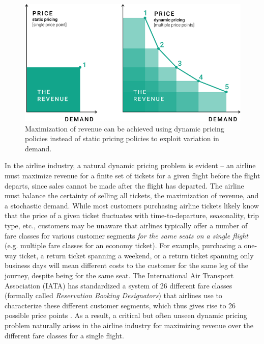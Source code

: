 \documentclass[letterpaper]{article}%
\begin{document}
\begin{figure}[t]
    \centering
    \includegraphics[width=0.99\linewidth]{final-paper/plots/static-dynamic-pricing.png}
    \caption{Maximization of revenue can be achieved using dynamic pricing policies instead of static pricing policies to exploit variation in demand. \cite{Competitoor2016Dynamic2016}}
    \label{fig:static-dynamic-pricing}
\end{figure}

In the airline industry, a natural dynamic pricing problem is evident -- an airline must maximize revenue for a finite set of tickets for a given flight before the flight departs, since sales cannot be made after the flight has departed. The airline must balance the certainty of selling all tickets, the maximization of revenue, and a stochastic demand. While most customers purchasing airline tickets likely know that the price of a given ticket fluctuates with time-to-departure, seasonality, trip type, etc., customers may be unaware that airlines typically offer a number of fare classes for various customer segments \textit{for the same seats on a single flight} (e.g. multiple fare classes for an economy ticket). For example, purchasing a one-way ticket, a return ticket spanning a weekend, or a return ticket spanning only business days will mean different costs to the customer for the same leg of the journey, despite being for the same seat. The International Air Transport Association (IATA) has standardized a system of 26 different fare classes (formally called \textit{Reservation Booking Designators}) that airlines use to characterize these different customer segments, which thus gives rise to 26 possible price points \cite{Touraine2018DynamicPaper}. As a result, a critical but often unseen dynamic pricing problem naturally arises in the airline industry for maximizing revenue over the different fare classes for a single flight.
\end{document}
